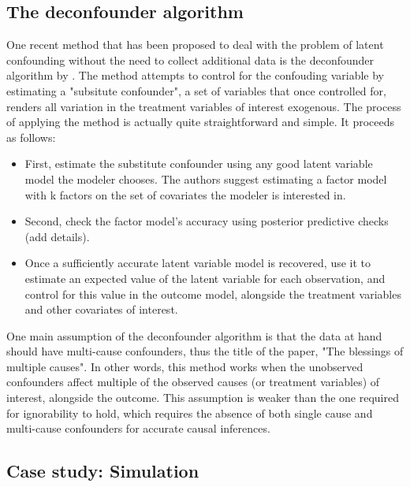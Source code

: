 \subsection{The deconfounder algorithm}
\label{sec:deconfounder-algo}



One recent method that has been proposed to deal with the problem of latent 
confounding without the need to collect additional data is the deconfounder 
algorithm by \citet{wang_2019_blessings}. The method attempts to control for the 
confouding variable by estimating a "subsitute confounder", a set of variables 
that once controlled for, renders all variation in the treatment variables of 
interest exogenous. The process of applying the method is actually quite 
straightforward and simple. It proceeds as follows:
\begin{itemize}
	\item First, estimate the substitute confounder using any good latent variable 
	model the modeler chooses. The authors suggest estimating a factor model 
	with k factors on the set of covariates the modeler is interested in. 
	\item Second, check the factor model's accuracy using posterior predictive 
	checks (add details). 
	\item Once a sufficiently accurate latent variable model is recovered, use it 
	to estimate an expected value of the latent variable for each observation, 
	and control for this value in the outcome model, alongside the treatment 
	variables and other covariates of interest. 
\end{itemize}



One main assumption of the deconfounder algorithm is that the data at hand 
should have multi-cause confounders, thus the title of the paper, "The 
blessings of multiple causes". In other words, this method works when the 
unobserved confounders affect multiple of the observed causes (or treatment 
variables) of interest, alongside the outcome. This assumption is weaker than 
the one required for ignorability to hold, which requires the absence of both 
single cause and multi-cause confounders for accurate causal inferences. 



\subsection{Case study: Simulation}
\label{sec:deconfounder-simulation}

